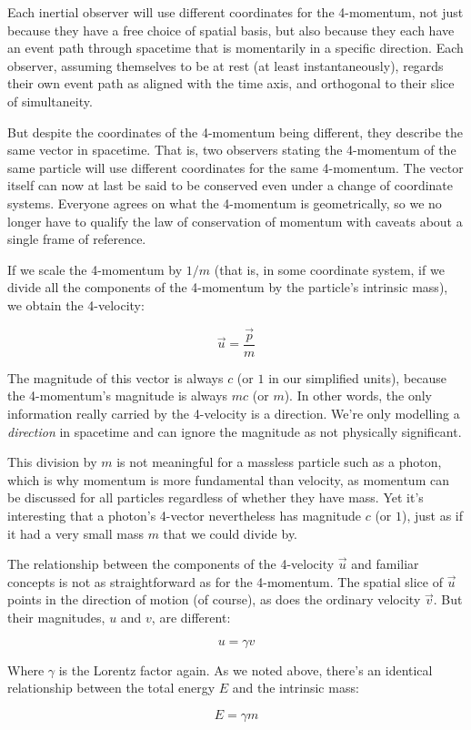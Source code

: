 Each inertial observer will use different coordinates for the 4-momentum, not just because they have a free choice of spatial basis, but also because they each have an event path through spacetime that is momentarily in a specific direction. Each observer, assuming themselves to be at rest (at least instantaneously), regards their own event path as aligned with the time axis, and orthogonal to their slice of simultaneity.

But despite the coordinates of the 4-momentum being different, they describe the same vector in spacetime. That is, two observers stating the 4-momentum of the same particle will use different coordinates for the same 4-momentum. The vector itself can now at last be said to be conserved even under a change of coordinate systems. Everyone agrees on what the 4-momentum is geometrically, so we no longer have to qualify the law of conservation of momentum with caveats about a single frame of reference.

If we scale the 4-momentum by $1/m$ (that is, in some coordinate system, if we divide all the components of the 4-momentum by the particle's intrinsic mass), we obtain the 4-velocity:

$$\vec{u} = \frac{\vec{p}}{m}$$

The magnitude of this vector is always $c$ (or $1$ in our simplified units), because the 4-momentum's magnitude is always $mc$ (or $m$). In other words, the only information really carried by the 4-velocity is a direction. We're only modelling a \textit{direction} in spacetime and can ignore the magnitude as not physically significant.

This division by $m$ is not meaningful for a massless particle such as a photon, which is why momentum is more fundamental than velocity, as momentum can be discussed for all particles regardless of whether they have mass. Yet it's interesting that a photon's 4-vector nevertheless has magnitude $c$ (or $1$), just as if it had a very small mass $m$ that we could divide by.

The relationship between the components of the 4-velocity $\vec{u}$ and familiar concepts is not as straightforward as for the 4-momentum. The spatial slice of $\vec{u}$ points in the direction of motion (of course), as does the ordinary velocity $\vec{v}$. But their magnitudes, $u$ and $v$, are different:

$$u = \gamma v$$

Where $\gamma$ is the Lorentz factor again. As we noted above, there's an identical relationship between the total energy $E$ and the intrinsic mass:

$$E = \gamma m$$
